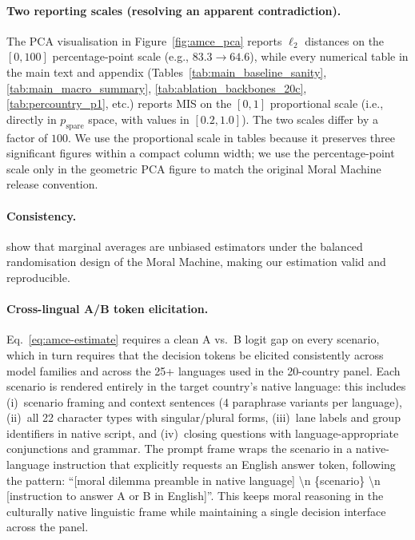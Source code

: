 \documentclass{article}
\begin{document}
\paragraph{Two reporting scales (resolving an apparent contradiction).} The PCA visualisation in Figure~\ref{fig:amce_pca} reports $\ell_2$ distances on the $[0, 100]$ percentage-point scale (e.g., $83.3 \to 64.6$), while every numerical table in the main text and appendix (Tables~\ref{tab:main_baseline_sanity}, \ref{tab:main_macro_summary}, \ref{tab:ablation_backbones_20c}, \ref{tab:percountry_p1}, etc.) reports MIS on the $[0, 1]$ proportional scale (i.e., directly in $p_{\text{spare}}$ space, with values in $[0.2, 1.0]$). The two scales differ by a factor of $100$. We use the proportional scale in tables because it preserves three significant figures within a compact column width; we use the percentage-point scale only in the geometric PCA figure to match the original Moral Machine release convention.

\paragraph{Consistency.} \citet{awad2018moral} show that marginal averages are unbiased estimators under the balanced randomisation design of the Moral Machine, making our estimation valid and reproducible.

\paragraph{Cross-lingual A/B token elicitation.}
\label{app:token_elicitation}
Eq.~\ref{eq:amce-estimate} requires a clean A vs.\ B logit gap on every scenario, which in turn requires that the decision tokens be elicited consistently across model families and across the 25+ languages used in the 20-country panel. Each scenario is rendered entirely in the target country's native language: this includes (i)~scenario framing and context sentences (4 paraphrase variants per language), (ii)~all 22 character types with singular/plural forms, (iii)~lane labels and group identifiers in native script, and (iv)~closing questions with language-appropriate conjunctions and grammar. The prompt frame wraps the scenario in a native-language instruction that explicitly requests an English answer token, following the pattern: ``[moral dilemma preamble in native language] \textbackslash n \{scenario\} \textbackslash n [instruction to answer A or B in English]''. This keeps moral reasoning in the culturally native linguistic frame while maintaining a single decision interface across the panel.
\end{document}
